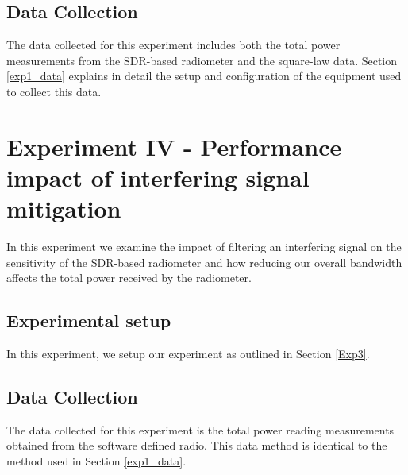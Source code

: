 \subsection{Data Collection}

The data collected for this experiment includes both the total power measurements from the SDR-based radiometer and the square-law data.  Section \ref{exp1_data} explains in detail the setup and configuration of the equipment used to collect this data.

\section{Experiment IV - Performance impact of interfering signal mitigation}\label{Exp4}

In this experiment we examine the impact of filtering an interfering signal on the sensitivity of the SDR-based radiometer and how reducing our overall bandwidth affects the total power received by the radiometer.

\subsection{Experimental setup} \label{exp4_setup}

In this experiment, we setup our experiment as outlined in Section \ref{Exp3}.

\subsection{Data Collection}

The data collected for this experiment is the total power reading measurements obtained from the software defined radio.  This data method is identical to the method used in Section \ref{exp1_data}.




